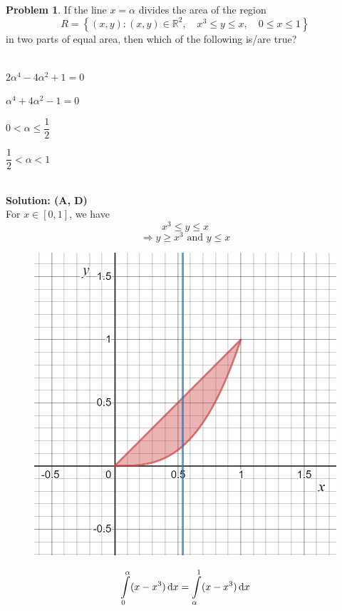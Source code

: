 \documentclass[14]{article}
\theoremstyle{definition}
\newtheorem{prob}{Problem}
\theoremstyle{case}
\begin{document}
\pagebreak
\begin{prob}
If the line $x = \alpha$ divides the area of the region
\[R = \left\{ (x, y) : (x, y) \in \mathbb{R}^2,\quad x^3 \leq y \leq x, \quad 0 \leq x \leq 1 \right\}\]
in two parts of equal area, then which of the following is/are true?\\\\
\begin{enumerate*}[label=(\Alph*)]
\item $2\alpha^4 - 4\alpha^2 + 1 = 0\quad\quad\quad$
\item $\alpha^4 + 4\alpha^2 - 1 = 0\quad\quad\quad$
\item $0 < \alpha \leq \dfrac12\quad\quad\quad$
\item $\dfrac12 < \alpha < 1$
\end{enumerate*}\\
\textbf{Solution: (A, D) }\\
For $x \in [0, 1]$, we have
\[x^3 \leq y \leq x\]
\[\Rightarrow y \geq x^3 \text{ and } y \leq x\]
\begin{figure}[h]\centering
\includegraphics[scale=.2]{images/area_half_x3yx}
\end{figure}
\begin{align*}
\int\limits_0^{\alpha} (x - x^3) \dif x &= \int\limits_{\alpha}^1 (x - x^3) \dif x\\

\end{align*}
\end{prob}
\end{document}
